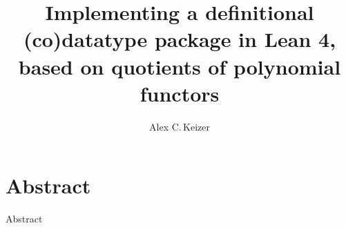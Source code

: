 
%
%
\title{Implementing a definitional (co)datatype package in Lean 4, based on quotients of polynomial functors}
\author{Alex C.\,Keizer}
\maketitle


\chapter*{Abstract}
\begin{todo}
    Abstract
\end{todo}

\tableofcontents


\newpage
{}